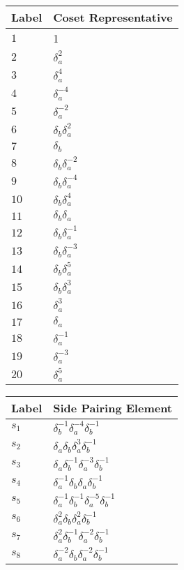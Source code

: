 \documentclass{article}
\begin{document}
\begin{center}
\begin{tabular}{ll}
\toprule
Label & Coset Representative\\
\midrule
$1$ & 1 \\
$2$ & $\delta_a^{2}$ \\
$3$ & $\delta_a^{4}$ \\
$4$ & $\delta_a^{-4}$ \\
$5$ & $\delta_a^{-2}$ \\
$6$ & $\delta_b^{}\delta_a^{2}$ \\
$7$ & $\delta_b^{}$ \\
$8$ & $\delta_b^{}\delta_a^{-2}$ \\
$9$ & $\delta_b^{}\delta_a^{-4}$ \\
$10$ & $\delta_b^{}\delta_a^{4}$ \\
$11$ & $\delta_b^{}\delta_a^{}$ \\
$12$ & $\delta_b^{}\delta_a^{-1}$ \\
$13$ & $\delta_b^{}\delta_a^{-3}$ \\
$14$ & $\delta_b^{}\delta_a^{5}$ \\
$15$ & $\delta_b^{}\delta_a^{3}$ \\
$16$ & $\delta_a^{3}$ \\
$17$ & $\delta_a^{}$ \\
$18$ & $\delta_a^{-1}$ \\
$19$ & $\delta_a^{-3}$ \\
$20$ & $\delta_a^{5}$ \\
\bottomrule
\end{tabular}
\hfill
\begin{tabular}{ll}
\toprule
Label & Side Pairing Element\\
\midrule
$s_{1}$ & $\delta_b^{-1}\delta_a^{-4}\delta_b^{-1}$ \\
$s_{2}$ & $\delta_a^{}\delta_b^{}\delta_a^{3}\delta_b^{-1}$ \\
$s_{3}$ & $\delta_a^{}\delta_b^{-1}\delta_a^{-3}\delta_b^{-1}$ \\
$s_{4}$ & $\delta_a^{-1}\delta_b^{}\delta_a^{}\delta_b^{-1}$ \\
$s_{5}$ & $\delta_a^{-1}\delta_b^{-1}\delta_a^{-5}\delta_b^{-1}$ \\
$s_{6}$ & $\delta_a^{2}\delta_b^{}\delta_a^{2}\delta_b^{-1}$ \\
$s_{7}$ & $\delta_a^{2}\delta_b^{-1}\delta_a^{-2}\delta_b^{-1}$ \\
$s_{8}$ & $\delta_a^{-2}\delta_b^{}\delta_a^{-2}\delta_b^{-1}$ \\

\end{tabular}
\end{center}
\end{document}

